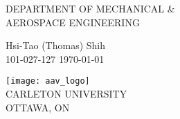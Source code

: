 \begin{titlepage}
    \begin{center}
        \vspace{1cm}
 
        \large
        DEPARTMENT OF MECHANICAL \& \\
        AEROSPACE ENGINEERING
 
        \vspace{5em}

        \huge

        \vspace{3em}
 
        \large

        \vspace{1em}
        Hsi-Tao (Thomas) Shih\\
        101-027-127
        \today
 
        \vfill
             
        \vspace{1em}
      
        \texttt{[image: aav\_logo]}\\
        \footnotesize
        CARLETON UNIVERSITY\\
        OTTAWA, ON
             
    \end{center}
\end{titlepage}